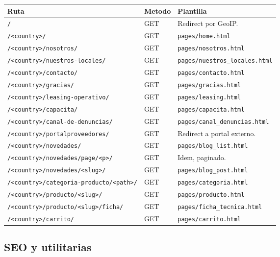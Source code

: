 \documentclass[11pt,a4paper]{article}
\begin{document}
\begin{longtable}{p{6cm} p{3cm} p{5.5cm}}
\toprule
\textbf{Ruta} & \textbf{Metodo} & \textbf{Plantilla} \\
\midrule
\endhead
\texttt{/}                                            & GET & Redirect por GeoIP. \\
\texttt{/<country>/}                                  & GET & \texttt{pages/home.html} \\
\texttt{/<country>/nosotros/}                         & GET & \texttt{pages/nosotros.html} \\
\texttt{/<country>/nuestros-locales/}                 & GET & \texttt{pages/nuestros\_locales.html} \\
\texttt{/<country>/contacto/}                         & GET & \texttt{pages/contacto.html} \\
\texttt{/<country>/gracias/}                          & GET & \texttt{pages/gracias.html} \\
\texttt{/<country>/leasing-operativo/}                & GET & \texttt{pages/leasing.html} \\
\texttt{/<country>/capacita/}                         & GET & \texttt{pages/capacita.html} \\
\texttt{/<country>/canal-de-denuncias/}               & GET & \texttt{pages/canal\_denuncias.html} \\
\texttt{/<country>/portalproveedores/}                & GET & Redirect a portal externo. \\
\texttt{/<country>/novedades/}                        & GET & \texttt{pages/blog\_list.html} \\
\texttt{/<country>/novedades/page/<p>/}               & GET & Idem, paginado. \\
\texttt{/<country>/novedades/<slug>/}                 & GET & \texttt{pages/blog\_post.html} \\
\texttt{/<country>/categoria-producto/<path>/}        & GET & \texttt{pages/categoria.html} \\
\texttt{/<country>/producto/<slug>/}                  & GET & \texttt{pages/producto.html} \\
\texttt{/<country>/producto/<slug>/ficha/}            & GET & \texttt{pages/ficha\_tecnica.html} \\
\texttt{/<country>/carrito/}                          & GET & \texttt{pages/carrito.html} \\
\bottomrule
\end{longtable}

\subsection{SEO y utilitarias}
\end{document}
